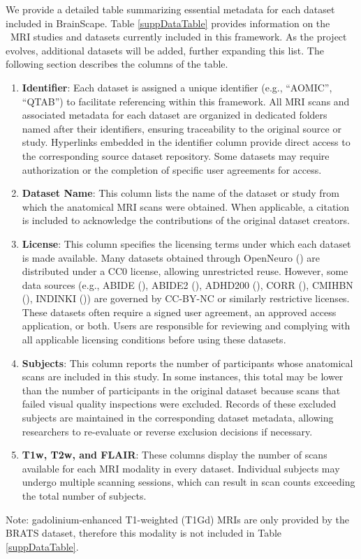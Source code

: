 
We provide a detailed table summarizing essential metadata for each dataset included in BrainScape. 
Table \ref{suppDataTable} provides information on the \NumDatasets\ MRI studies and datasets currently included in this framework.
As the project evolves, additional datasets will be added, further expanding this list. 
The following section describes the columns of the table.

\begin{enumerate}
    \item \textbf{Identifier}: Each dataset is assigned a unique identifier (e.g., ``AOMIC'', ``QTAB'') to facilitate referencing within this framework. 
    All MRI scans and associated metadata for each dataset are organized in dedicated folders named after their identifiers, ensuring traceability to the original source or study. 
    Hyperlinks embedded in the identifier column provide direct access to the corresponding source dataset repository.
    Some datasets may require authorization or the completion of specific user agreements for access.

    \item \textbf{Dataset Name}: This column lists the name of the dataset or study from which the anatomical MRI scans were obtained. 
    When applicable, a citation is included to acknowledge the contributions of the original dataset creators.

    \item \textbf{License}: This column specifies the licensing terms under which each dataset is made available. 
    Many datasets obtained through OpenNeuro (\cite{markiewicz2021openneuro}) are distributed under a CC0 license, allowing unrestricted reuse.
    However, some data sources (e.g., ABIDE (\cite{di2014autism}), ABIDE2 (\cite{di2017enhancing}), ADHD200 (\cite{adhd2012adhd}), CORR (\cite{zuo2014open}), CMIHBN (\cite{alexander2017open}), INDINKI (\cite{nooner2012nki})) are governed by CC-BY-NC or similarly restrictive licenses. 
    These datasets often require a signed user agreement, an approved access application, or both. 
    Users are responsible for reviewing and complying with all applicable licensing conditions before using these datasets. 
    
    \item \textbf{Subjects}:  This column reports the number of participants whose anatomical scans are included in this study.
    In some instances, this total may be lower than the number of participants in the original dataset because scans that failed visual quality inspections were excluded. 
    Records of these excluded subjects are maintained in the corresponding dataset metadata, allowing researchers to re-evaluate or reverse exclusion decisions if necessary.

    \item \textbf{T1w, T2w, and FLAIR}: These columns display the number of scans available for each MRI modality in every dataset. 
    Individual subjects may undergo multiple scanning sessions, which can result in scan counts exceeding the total number of subjects. 
\end{enumerate}

Note: gadolinium-enhanced T1-weighted (T1Gd) MRIs are only provided by the BRATS dataset, therefore this modality is not included in Table \ref{suppDataTable}.


